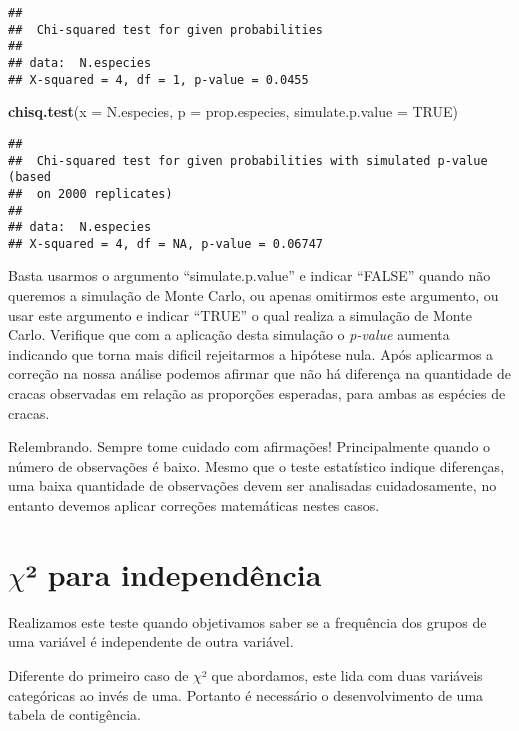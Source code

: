 \documentclass[14pt,titlepage, oneside, openany, a4paper]{book}
\newenvironment{Shaded}{\begin{snugshade}}{\end{snugshade}}
\newcommand{\DataTypeTok}[1]{\textcolor[rgb]{0.13,0.29,0.53}{#1}}
\newcommand{\KeywordTok}[1]{\textcolor[rgb]{0.13,0.29,0.53}{\textbf{#1}}}
\newcommand{\NormalTok}[1]{#1}
\newcommand{\OtherTok}[1]{\textcolor[rgb]{0.56,0.35,0.01}{#1}}
\begin{document}
\begin{verbatim}
## 
##  Chi-squared test for given probabilities
## 
## data:  N.especies
## X-squared = 4, df = 1, p-value = 0.0455
\end{verbatim}

\begin{Shaded}
\begin{Highlighting}[]
\KeywordTok{chisq.test}\NormalTok{(}\DataTypeTok{x =}\NormalTok{ N.especies, }\DataTypeTok{p =}\NormalTok{ prop.especies, }\DataTypeTok{simulate.p.value =} \OtherTok{TRUE}\NormalTok{)}
\end{Highlighting}
\end{Shaded}

\begin{verbatim}
## 
##  Chi-squared test for given probabilities with simulated p-value (based
##  on 2000 replicates)
## 
## data:  N.especies
## X-squared = 4, df = NA, p-value = 0.06747
\end{verbatim}

Basta usarmos o argumento ``simulate.p.value'' e indicar ``FALSE'' quando não queremos a simulação de Monte Carlo, ou apenas omitirmos este argumento, ou usar este argumento e indicar ``TRUE'' o qual realiza a simulação de Monte Carlo. Verifique que com a aplicação desta simulação o \emph{p-value} aumenta indicando que torna mais dificil rejeitarmos a hipótese nula. Após aplicarmos a correção na nossa análise podemos afirmar que não há diferença na quantidade de cracas observadas em relação as proporções esperadas, para ambas as espécies de cracas.

Relembrando. Sempre tome cuidado com afirmações! Principalmente quando o número de observações é baixo. Mesmo que o teste estatístico indique diferenças, uma baixa quantidade de observações devem ser analisadas cuidadosamente, no entanto devemos aplicar correções matemáticas nestes casos.

\hypertarget{chi-para-independuxeancia}{%
\section{\texorpdfstring{\(\chi\)² para independência}{\textbackslash{}chi² para independência}}\label{chi-para-independuxeancia}}

Realizamos este teste quando objetivamos saber se a frequência dos grupos de uma variável é independente de outra variável.

Diferente do primeiro caso de \(\chi\)² que abordamos, este lida com duas variáveis categóricas ao invés de uma. Portanto é necessário o desenvolvimento de uma tabela de contigência.
\end{document}
